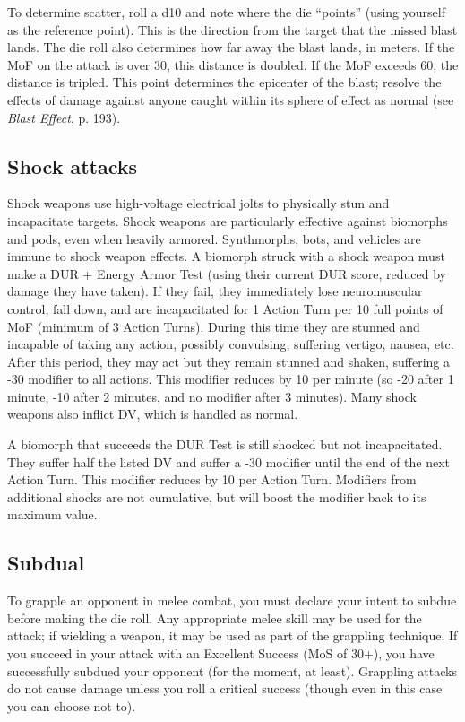 To determine scatter, roll a d10 and note where the die ``points'' (using yourself as the reference point). This is the direction from the target that the missed blast lands. The die roll also determines how far away the blast lands, in meters. If the MoF on the attack is over 30, this distance is doubled. If the MoF exceeds 60, the distance is tripled. This point determines the epicenter of the blast; resolve the effects of damage against anyone caught within its sphere of effect as normal (see \emph{Blast Effect}, p. 193). 



\subsection{Shock attacks} \label{sec:shock-attacks} 

Shock weapons use high-voltage electrical jolts to physically stun and incapacitate targets. Shock weapons are particularly effective against biomorphs and pods, even when heavily armored. Synthmorphs, bots, and vehicles are immune to shock weapon effects. A biomorph struck with a shock weapon must make a DUR + Energy Armor Test (using their current DUR score, reduced by damage they have taken). If they fail, they immediately lose neuromuscular control, fall down, and are incapacitated for 1 Action Turn per 10 full points of MoF (minimum of 3 Action Turns). During this time they are stunned and incapable of taking any action, possibly convulsing, suffering vertigo, nausea, etc. After this period, they may act but they remain stunned and shaken, suffering a -30 modifier to all actions. This modifier reduces by 10 per minute (so -20 after 1 minute, -10 after 2 minutes, and no modifier after 3 minutes). Many shock weapons also inflict DV, which is handled as normal. 

A biomorph that succeeds the DUR Test is still shocked but not incapacitated. They suffer half the listed DV and suffer a -30 modifier until the end of the next Action Turn. This modifier reduces by 10 per Action Turn. Modifiers from additional shocks are not cumulative, but will boost the modifier back to its maximum value. 



\subsection{Subdual} \label{sec:subdual} 

To grapple an opponent in melee combat, you must declare your intent to subdue before making the die roll. Any appropriate melee skill may be used for the attack; if wielding a weapon, it may be used as part of the grappling technique. If you succeed in your attack with an Excellent Success (MoS of 30+), you have successfully subdued your opponent (for the moment, at least). Grappling attacks do not cause damage unless you roll a critical success (though even in this case you can choose not to). 

